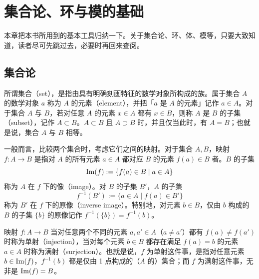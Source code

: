 \chapter{集合论、环与模的基础}

本章把本书所用到的基本工具归纳一下。关于集合论、环、体、模等，只要大致知道，读者尽可先跳过去，必要时再回来查阅。

\section{集合论}

所谓集合（set），是指由具有明确刻画特征的数学对象所构成的族。属于集合 $A$ 的数学对象 $a$ 称为 $A$ 的元素（element），并把「$a$ 是 $A$ 的元素」记作 $a\in A$。对于集合 $A$ 与 $B$，若对任意 $A$ 的元素 $x\in A$ 都有 $x\in B$，则称 $A$ 是 $B$ 的子集（subset），记作 $A\subset B$。$A\subset B$ 且 $A\supset B$ 时，并且仅当此时，有 $A=B$；也就是说，集合 $A$ 与 $B$ 相等。


一般而言，比较两个集合时，考虑它们之间的映射。对于集合 $A,B$，映射 $f\colon A\to B$ 是指对 $A$ 的所有元素 $a\in A$ 都对应 $B$ 的元素 $f(a)\in B$ 者。$B$ 的子集
\[
  \operatorname{Im}(f) := \{f(a)\in B \mid a\in A\}
\]
称为 $A$ 在 $f$ 下的像（image）。对 $B$ 的子集 $B'$，$A$ 的子集
\[
  f^{-1}(B') := \{a\in A \mid f(a)\in B'\}
\]
称为 $B'$ 在 $f$ 下的原像（inverse image）。特别地，对元素 $b\in B$，仅由 $b$ 构成的 $B$ 的子集 $\{b\}$ 的原像记作 $f^{-1}(\{b\}) = f^{-1}(b)$。

映射 $f\colon A\to B$ 当对任意两个不同的元素 $a,a'\in A$（$a\neq a'$）都有 $f(a)\neq f(a')$ 时称为单射（injection），当对每个元素 $b\in B$ 都存在满足 $f(a)=b$ 的元素 $a\in A$ 时称为满射（surjection）。也就是说，$f$ 为单射这件事，是指对任意元素 $b\in\operatorname{Im}(f)$，$f^{-1}(b)$ 都是仅由 1 点构成的（$A$ 的）集合；而 $f$ 为满射这件事，无非是 $\operatorname{Im}(f)=B$。


